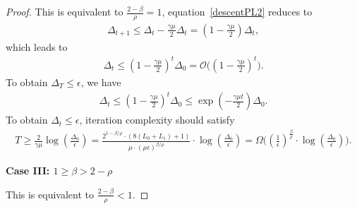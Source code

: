 \documentclass[10pt]{article} %
\def\eqref#1{equation~\ref{#1}}
\newtheorem{proof}{Proof}
\begin{document}
\begin{proof}
This is equivalent to $\frac{2-\beta}{\rho}=1$, \eqref{descentPL2} reduces to 
\begin{align}
    \Delta_{t+1}\leq \Delta_t - \frac{\gamma \mu}{2} \Delta_t = (1-\frac{\gamma\mu}{2})\Delta_t,\nonumber
\end{align}
which leads to
\begin{align}
    \Delta_t \leq (1-\frac{\gamma\mu}{2})^t \Delta_0 = \mathcal{O}\Big((1-\frac{\gamma \mu}{2})^t\Big). \nonumber
\end{align}
To obtain $\Delta_T\leq \epsilon$, we have
\begin{align}
    \Delta_t \leq (1-\frac{\gamma \mu}{2})^t \Delta_0 \leq \exp(-\frac{\gamma\mu t}{2})\Delta_0.
\end{align}
To obtain $\Delta_t \leq \epsilon$, iteration complexity should satisfy
\begin{align}
T\geq \frac{2}{\gamma \mu}\log(\frac{\Delta_0}{\epsilon})= \frac{2^{1-\beta/\rho}\cdot(8(L_0+L_1)+1)}{\mu\cdot(\mu\epsilon)^{\beta/\rho}}\cdot\log(\frac{\Delta_0}{\epsilon})=\Omega\big((\frac{1}{\epsilon})^{\frac{\beta}{\rho}}\cdot \log(\frac{\Delta_0}{\epsilon})\big)\nonumber.
\end{align}

\noindent\textbf{Case III: $1\geq\beta>2-\rho$} 

This is equivalent to $\frac{2-\beta}{\rho}<1$.


\end{proof}
\end{document}
